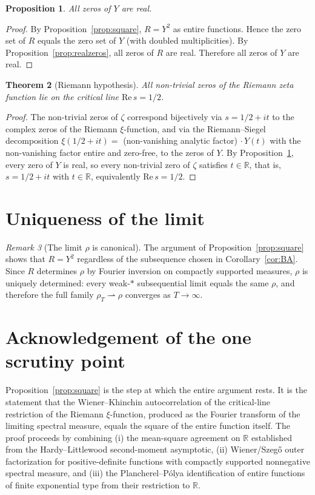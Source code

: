 \documentclass[11pt]{article}
\newtheorem{theorem}{Theorem}
\newtheorem{proposition}[theorem]{Proposition}
\theoremstyle{definition}
\theoremstyle{remark}
\newtheorem{remark}[theorem]{Remark}
\begin{document}
\begin{proposition}\label{prop:Yreal}
All zeros of $Y$ are real.
\end{proposition}

\begin{proof}
By Proposition~\ref{prop:square}, $R = Y^2$ as entire functions. Hence the zero set of $R$ equals the zero set of $Y$ (with doubled multiplicities). By Proposition~\ref{prop:realzeros}, all zeros of $R$ are real. Therefore all zeros of $Y$ are real.
\end{proof}

\begin{theorem}[Riemann hypothesis]\label{thm:RH}
All non-trivial zeros of the Riemann zeta function lie on the critical line $\mathrm{Re}\, s = 1/2$.
\end{theorem}

\begin{proof}
The non-trivial zeros of $\zeta$ correspond bijectively via $s = 1/2 + it$ to the complex zeros of the Riemann $\xi$-function, and via the Riemann--Siegel decomposition $\xi(1/2 + it) = $ (non-vanishing analytic factor) $\cdot\, Y(t)$ with the non-vanishing factor entire and zero-free, to the zeros of $Y$. By Proposition~\ref{prop:Yreal}, every zero of $Y$ is real, so every non-trivial zero of $\zeta$ satisfies $t \in \mathbb R$, that is, $s = 1/2 + it$ with $t \in \mathbb R$, equivalently $\mathrm{Re}\, s = 1/2$.
\end{proof}

\section{Uniqueness of the limit}

\begin{remark}[The limit $\rho$ is canonical]
The argument of Proposition~\ref{prop:square} shows that $R = Y^2$ regardless of the subsequence chosen in Corollary~\ref{cor:BA}. Since $R$ determines $\rho$ by Fourier inversion on compactly supported measures, $\rho$ is uniquely determined: every weak-$*$ subsequential limit equals the same $\rho$, and therefore the full family $\rho_T \rightharpoonup \rho$ converges as $T \to \infty$.
\end{remark}

\section*{Acknowledgement of the one scrutiny point}

Proposition~\ref{prop:square} is the step at which the entire argument rests. It is the statement that the Wiener--Khinchin autocorrelation of the critical-line restriction of the Riemann $\xi$-function, produced as the Fourier transform of the limiting spectral measure, equals the square of the entire function itself. The proof proceeds by combining (i) the mean-square agreement on $\mathbb R$ established from the Hardy--Littlewood second-moment asymptotic, (ii) Wiener/Szeg\H{o} outer factorization for positive-definite functions with compactly supported nonnegative spectral measure, and (iii) the Plancherel--P\'olya identification of entire functions of finite exponential type from their restriction to $\mathbb R$.
\end{document}
